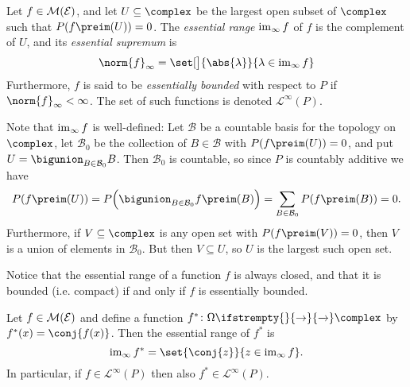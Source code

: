 \documentclass[article, a4paper, 11pt, oneside]{memoir}
\numberwithin{equation}{chapter}
\newcommand{\calB}{\mathcal{B}}
\newcommand{\calE}{\mathcal{E}}
\newcommand{\calL}{\mathcal{L}}
\renewcommand\to[1][]{%
    \ifstrempty{#1}{%
        \rightarrow
    }{%
        \xrightarrow[#1]{}
    }%
}
\begin{document}
\begin{definition}
    Let $f \in \meas{\calE}$, and let $U \subseteq \complex$ be the largest open subset of $\complex$ such that $P(f\preim(U)) = 0$. The \emph{essential range} $\operatorname{im}_\infty f$ of $f$ is the complement of $U$, and its \emph{essential supremum} is
    \begin{equation*}
        \norm{f}_\infty
            = \set[\big]{\abs{\lambda}}{\lambda \in \essran f}
    \end{equation*}
    Furthermore, $f$ is said to be \emph{essentially bounded} with respect to $P$ if $\norm{f}_\infty < \infty$. The set of such functions is denoted $\calL^\infty(P)$.
\end{definition}
%
Note that $\operatorname{im}_\infty f$ is well-defined: Let $\calB$ be a countable basis for the topology on $\complex$, let $\calB_0$ be the collection of $B \in \calB$ with $P(f\preim(U)) = 0$, and put $U = \bigunion_{B \in \calB_0} B$. Then $\calB_0$ is countable, so since $P$ is countably additive we have
%
\begin{equation*}
    P(f\preim(U))
        = P \Bigl( \bigunion_{B \in \calB_0} f\preim(B) \Bigr)
        = \sum_{B \in \calB_0} P(f\preim(B))
        = 0.
\end{equation*}
%
Furthermore, if $V \subseteq \complex$ is any open set with $P(f\preim(V)) = 0$, then $V$ is a union of elements in $\calB_0$. But then $V \subseteq U$, so $U$ is the largest such open set.

Notice that the essential range of a function $f$ is always closed, and that it is bounded (i.e. compact) if and only if $f$ is essentially bounded.


\begin{lemma}
    Let $f \in \meas{\calE}$ and define a function $f^* \colon \Omega \to \complex$ by $f^*(x) = \conj{f(x)}$. Then the essential range of $f^*$ is
    \begin{equation}
        \label{eq:essran-involution}
        \essran f^*
            = \set{\conj{z}}{z \in \essran f}.
    \end{equation}
    In particular, if $f \in \calL^\infty(P)$ then also $f^* \in \calL^\infty(P)$.
\end{lemma}
\end{document}
